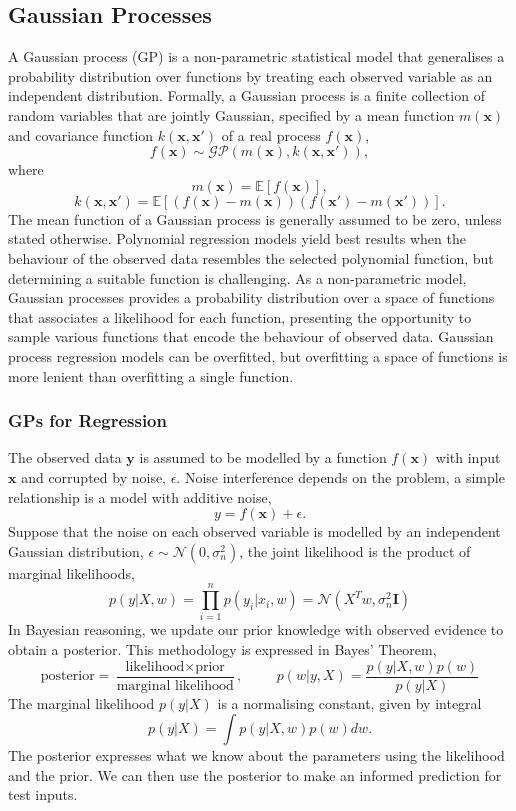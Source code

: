 \documentclass[ %
author={Dillon Keith Diep},
supervisor={Dr. Carl Henrik Ek},
degree={MEng},
title={ART-CG:},
subtitle={Assisted Real-time Content Generation of 3D Hair by Learning Manifolds},
type={Research},
year={2017} ]{dissertation}
\begin{document}
\subsection{Gaussian Processes}
A Gaussian process (GP) is a non-parametric statistical model that generalises a probability distribution over functions by treating each observed variable as an independent distribution. Formally, a Gaussian process is a finite collection of random variables that are jointly Gaussian, specified by a mean function $m(\bm{x})$ and covariance function $k(\bm{x},\bm{x'})$ of a real process $f(\bm{x})$, \cite[p.13]{gp}
$$f(\bm{x})\sim\mathcal{GP}(m(\bm{x}), k(\bm{x}, \bm{x'})),$$
where
$$m(\bm{x})=\mathbb{E}[f(\bm{x})],$$
$$k(\bm{x},\bm{x'})=\mathbb{E}[(f(\bm{x})-m(\bm{x}))(f(\bm{x'})-m(\bm{x'}))].$$
The mean function of a Gaussian process is generally assumed to be zero, unless stated otherwise.
Polynomial regression models yield best results when the behaviour of the observed data resembles the selected polynomial function, but determining a suitable function is challenging. As a non-parametric model, Gaussian processes provides a probability distribution over a space of functions that associates a likelihood for each function, presenting the opportunity to sample various functions that encode the behaviour of observed data. Gaussian process regression models can be overfitted, but overfitting a space of functions is more lenient than overfitting a single function.

\subsubsection{GPs for Regression}
The observed data $\bm{y}$ is assumed to be modelled by a function $f(\bm{x})$ with input $\bm{x}$ and corrupted by noise, $\epsilon$. Noise interference depends on the problem, a simple relationship is a model with additive noise,
$$y = f(\bm{x}) + \epsilon.$$
Suppose that the noise on each observed variable is modelled by an independent Gaussian distribution, $\epsilon\sim\mathcal{N}(0, \sigma^2_n)$, the joint likelihood is the product of marginal likelihoods,
$$p(y|X,w)=\prod^n_{i=1}p(y_i|x_i, w)=\mathcal{N}(X^Tw, \sigma^2_n\bm{I})$$
In Bayesian reasoning, we update our prior knowledge with observed evidence to obtain a posterior. This methodology is expressed in Bayes' Theorem,
\begin{equation} \label{bayes}
\text{posterior}=\frac{\text{likelihood}\times\text{prior}}{\text{marginal likelihood}}, \hspace{1cm} p(w|y,X)=\frac{p(y|X,w)p(w)}{p(y|X)}
\end{equation}
The marginal likelihood $p(y|X)$ is a normalising constant, given by integral
$$p(y|X)=\int p(y|X,w)p(w)dw.$$
The posterior expresses what we know about the parameters using the likelihood and the prior. We can then use the posterior to make an informed prediction for test inputs.
\end{document}
